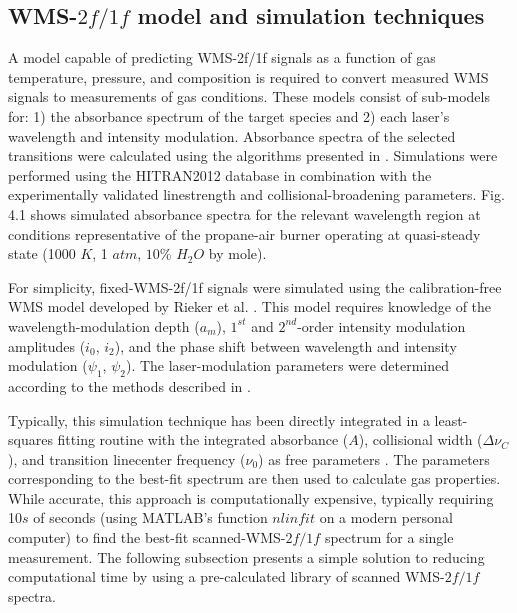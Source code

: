 \subsection{WMS-$2f/1f$ model and simulation techniques}
A model capable of predicting WMS-2f/1f signals as a function of gas temperature, pressure, and composition is required to convert measured WMS signals to measurements of gas conditions. These models consist of sub-models for: 1) the absorbance spectrum of the target species and 2) each laser’s wavelength and intensity modulation.
Absorbance spectra of the selected transitions were calculated using the algorithms presented in \cite{GOLDENSTEIN2017249}. Simulations were performed using the HITRAN2012 database \cite{2013JQSRT.130....4R} in combination with the experimentally validated linestrength and collisional-broadening parameters. Fig. 4.1 shows simulated absorbance spectra for the relevant wavelength region at conditions representative of the propane-air burner operating at quasi-steady state (1000 $K$, 1 $atm$, $10\%$ $H_2O$ by mole). 

For simplicity, fixed-WMS-2f/1f signals were simulated using the calibration-free WMS model developed by Rieker et al. \cite{rieker2009calibration}. This model requires knowledge of the wavelength-modulation depth ($a_m$), $1^{st}$ and $2^{nd}$-order intensity modulation amplitudes ($i_0$, $i_2$), and the phase shift between wavelength and intensity modulation ($\psi_1$, $\psi_2$). The laser-modulation parameters were determined according to the methods described in \cite{rieker2009calibration}.

Typically, this simulation technique has been directly integrated in a least-squares fitting routine with the integrated absorbance ($A$), collisional width ($\Delta\nu_C$), and transition linecenter frequency ($\nu_0$) as free parameters \cite{Goldenstein:16,Goldenstein2014,goldenstein2014scanned,spearrin2014simultaneous}. The parameters corresponding to the best-fit spectrum are then used to calculate gas properties. While accurate, this approach is computationally expensive, typically requiring 10$s$ of seconds (using MATLAB's function $nlinfit$ on a modern personal computer) to find the best-fit scanned-WMS-$2f/1f$ spectrum for a single measurement. The following subsection presents a simple solution to reducing computational time by using a pre-calculated library of scanned WMS-$2f/1f$ spectra.

